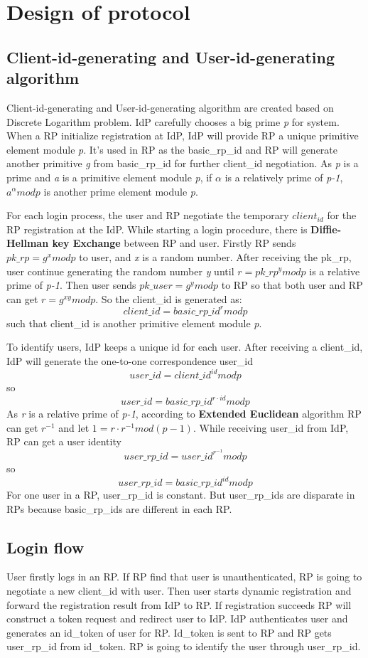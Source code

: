 \section{Design of protocol}
\label{sec:protocol}
\subsection{Client-id-generating and User-id-generating algorithm}
Client-id-generating and User-id-generating algorithm are created based on Discrete Logarithm problem\cite{shiu2007cryptography:}.
IdP carefully chooses a big prime \emph{p}\cite{rfc3526} for system. When a RP initialize registration at IdP, IdP will provide RP a unique primitive element module \emph{p}. It's used in RP as the basic\_rp\_id and RP will generate another primitive \emph{g} from basic\_rp\_id for further client\_id negotiation. As \emph{p} is a prime and \emph{a} is a primitive element module \emph{p}, if $\alpha$ is a relatively prime of \emph{p-1}, $a^\alpha mod p$ is another prime element module \emph{p}.

For each login process, the user and RP negotiate the temporary $client_{id}$ for the RP registration at the IdP.
While starting a login procedure, there is \textbf{Diffie-Hellman key Exchange}\cite{DiffieH76} between RP and user. Firstly RP sends $pk\_rp=g^x mod p$ to user, and \emph{x} is a random number. After receiving the pk\_rp, user continue generating the random number \emph{y} until $r=pk\_rp^y mod p$ is a relative prime of \emph{p-1}. Then user sends $pk\_user=g^y mod p$ to RP so that both user and RP can get $r=g^{xy} mod p$. So the client\_id is generated as: $$client\_id=basic\_rp\_id^r mod p$$ such that client\_id is another primitive element module \emph{p}.

To identify users, IdP keeps a unique id for each user. After receiving a client\_id, IdP will generate the one-to-one correspondence user\_id$$user\_id=client\_id^{id} mod p$$so$$user\_id=basic\_rp\_id^{r\cdot id}modp$$
As \emph{r} is a relative prime of \emph{p-1}, according to \textbf{Extended Euclidean} algorithm RP can get $r^{-1}$ and let $1=r\cdot r^{-1} mod (p-1)$. While receiving user\_id from IdP, RP can get a user identity $$user\_rp\_id=user\_id^{r^{-1}} mod p$$so$$user\_rp\_id=basic\_rp\_id^{id} mod p$$For one user in a RP, user\_rp\_id is constant. But  user\_rp\_ids are disparate in RPs because basic\_rp\_ids are different in each RP.

\subsection{Login flow}
User firstly logs in an RP. If RP find that user is unauthenticated, RP is going to negotiate a new client\_id with user. Then user starts dynamic registration and forward the registration result from IdP to RP. If registration succeeds RP will construct a token request and redirect user to IdP. IdP authenticates user and generates an id\_token of user for RP. Id\_token is sent to RP and RP gets user\_rp\_id from id\_token. RP is going to identify the user through user\_rp\_id. 

